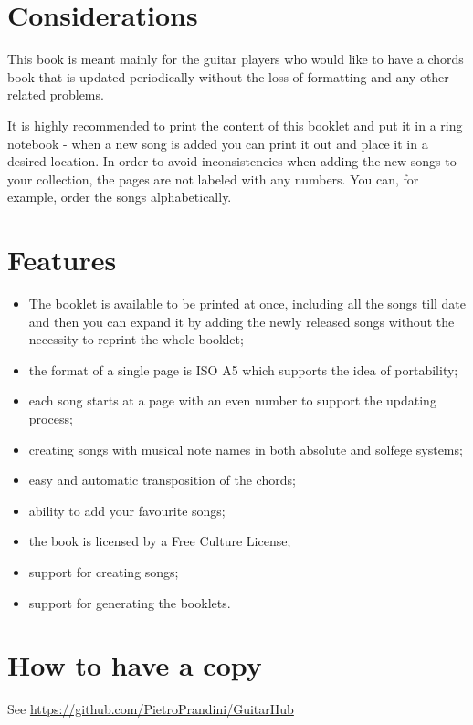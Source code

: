 \section*{Considerations}
This book is meant mainly for the guitar players who would like to have a chords book that is updated periodically without the loss of formatting and any other related problems.\par
It is highly recommended to print the content of this booklet and put it in a ring notebook - when a new song is added you can print it out and place it in a desired location. In order to avoid inconsistencies when adding the new songs to your collection, the pages are not labeled with any numbers. You can, for example, order the songs alphabetically.\par

\section*{Features}
\begin{itemize}
\item The booklet is available to be printed at once, including all the songs till date and then you can expand it by adding the newly released songs without the necessity to reprint the whole booklet;
\item the format of a single page is ISO A5 which supports the idea of  portability;
\item each song starts at a page with an even number to support the updating process;
\item creating songs with musical note names in both absolute and solfege systems;
\item easy and automatic transposition of the chords;
\item ability to add your favourite songs;
\item the book is licensed by a Free Culture License;
\item support for creating songs;
\item support for generating the booklets.
\end{itemize}

\section*{How to have a copy}
See \href{https://github.com/PietroPrandini/GuitarHub}{https://github.com/PietroPrandini/GuitarHub}

\begin{center}
\end{center}
